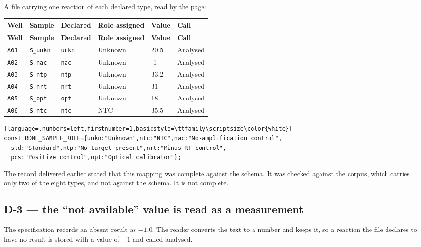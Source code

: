 A file carrying one reaction of each declared type, read by the page:

{\small
\begin{xltabular}{\linewidth}{|X|l|l|l|l|l|}
\toprule \textbf{Well} & \textbf{Sample} & \textbf{Declared} & \textbf{Role assigned} & \textbf{Value} & \textbf{Call} \\\midrule\endfirsthead
\toprule \textbf{Well} & \textbf{Sample} & \textbf{Declared} & \textbf{Role assigned} & \textbf{Value} & \textbf{Call} \\\midrule\endhead
\texttt{A01} & \texttt{S\_unkn} & \texttt{unkn} & Unknown & 20.5 & Analysed \\
\texttt{A02} & \texttt{S\_nac} & \texttt{nac} & Unknown & -1 & Analysed \\
\texttt{A03} & \texttt{S\_ntp} & \texttt{ntp} & Unknown & 33.2 & Analysed \\
\texttt{A04} & \texttt{S\_nrt} & \texttt{nrt} & Unknown & 31 & Analysed \\
\texttt{A05} & \texttt{S\_opt} & \texttt{opt} & Unknown & 18 & Analysed \\
\texttt{A06} & \texttt{S\_ntc} & \texttt{ntc} & NTC & 35.5 & Analysed \\
\bottomrule
\end{xltabular}}

\begin{lstlisting}[language=,numbers=left,firstnumber=1,basicstyle=\ttfamily\scriptsize\color{white}]
const RDML_SAMPLE_ROLE={unkn:"Unknown",ntc:"NTC",nac:"No-amplification control",
  std:"Standard",ntp:"No target present",nrt:"Minus-RT control",
  pos:"Positive control",opt:"Optical calibrator"};
\end{lstlisting}


The record delivered earlier stated that this mapping was complete against the
schema. It was checked against the corpus, which carries only two of the eight
types, and not against the schema. It is not complete.

\subsection*{D-3 --- the ``not available'' value is read as a measurement}
The specification records an absent result as $-1.0$. The reader converts the text
to a number and keeps it, so a reaction the file declares to have no result is
stored with a value of $-1$ and called analysed.

